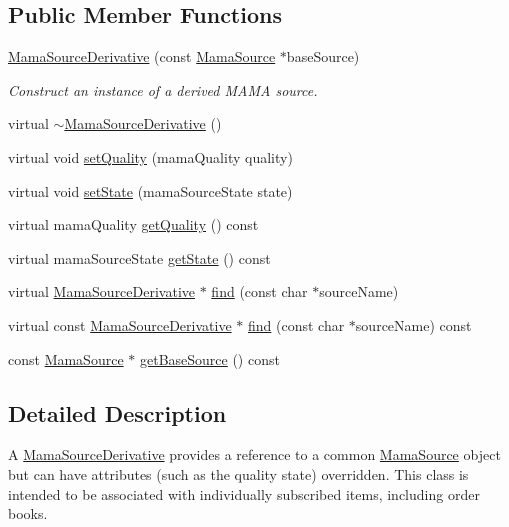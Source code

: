 \subsection*{Public Member Functions}
\begin{DoxyCompactItemize}
\item 
\hyperlink{classWombat_1_1MamaSourceDerivative_af74ddda87ac625872d9343e45a9db14b}{MamaSourceDerivative} (const \hyperlink{classWombat_1_1MamaSource}{MamaSource} $\ast$baseSource)
\begin{DoxyCompactList}\small\item\em Construct an instance of a derived MAMA source. \item\end{DoxyCompactList}\item 
virtual \hyperlink{classWombat_1_1MamaSourceDerivative_a26db36a75f3c011702b4eb8bfb3e06c8}{$\sim$MamaSourceDerivative} ()
\item 
virtual void \hyperlink{classWombat_1_1MamaSourceDerivative_aef1c1007d75a298118d421aea1467230}{setQuality} (mamaQuality quality)
\item 
virtual void \hyperlink{classWombat_1_1MamaSourceDerivative_a7fece4c57902446e3a6d6c7383d0dd05}{setState} (mamaSourceState state)
\item 
virtual mamaQuality \hyperlink{classWombat_1_1MamaSourceDerivative_a2890de3e06726484076e528175accbbf}{getQuality} () const 
\item 
virtual mamaSourceState \hyperlink{classWombat_1_1MamaSourceDerivative_a594b539ec60c664bde5478100b39147e}{getState} () const 
\item 
virtual \hyperlink{classWombat_1_1MamaSourceDerivative}{MamaSourceDerivative} $\ast$ \hyperlink{classWombat_1_1MamaSourceDerivative_a625240eadddf0f2f2f08d7187dbbd9f6}{find} (const char $\ast$sourceName)
\item 
virtual const \hyperlink{classWombat_1_1MamaSourceDerivative}{MamaSourceDerivative} $\ast$ \hyperlink{classWombat_1_1MamaSourceDerivative_a2c54840ec7876ccfd3213b021976132d}{find} (const char $\ast$sourceName) const 
\item 
const \hyperlink{classWombat_1_1MamaSource}{MamaSource} $\ast$ \hyperlink{classWombat_1_1MamaSourceDerivative_adaf9a73812a106107cace0fd88a6cfc0}{getBaseSource} () const 
\end{DoxyCompactItemize}


\subsection{Detailed Description}
A \hyperlink{classWombat_1_1MamaSourceDerivative}{MamaSourceDerivative} provides a reference to a common \hyperlink{classWombat_1_1MamaSource}{MamaSource} object but can have attributes (such as the quality state) overridden. This class is intended to be associated with individually subscribed items, including order books. 

